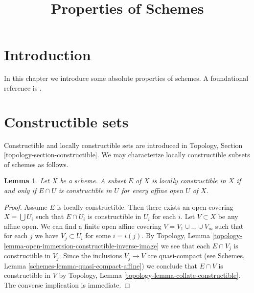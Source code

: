 \documentclass{stacks-project}
\theoremstyle{plain}
\newtheorem{lemma}[subsection]{Lemma}
\theoremstyle{definition}
\theoremstyle{remark}
\numberwithin{equation}{subsection}
\begin{document}
\title{Properties of Schemes}


\maketitle

\label{section-phantom}

\tableofcontents

\section{Introduction}
\label{section-introduction}

\noindent
In this chapter we introduce some absolute properties of schemes.
A foundational reference is \cite{EGA}.




\section{Constructible sets}
\label{section-constructible}

\noindent
Constructible and locally constructible sets are introduced in
Topology, Section \ref{topology-section-constructible}.
We may characterize locally constructible subsets of schemes as
follows.

\begin{lemma}
\label{lemma-locally-constructible}
Let $X$ be a scheme.
A subset $E$ of $X$ is locally constructible in $X$ if and only if
$E \cap U$ is constructible in $U$ for every affine open $U$ of $X$.
\end{lemma}

\begin{proof}
Assume $E$ is locally constructible. Then there exists an open covering
$X = \bigcup U_i$ such that $E \cap U_i$ is constructible in $U_i$
for each $i$. Let $V \subset X$ be any affine open. We can find a finite
open affine covering $V = V_1 \cup \ldots \cup V_m$ such that for each $j$
we have $V_j \subset U_i$ for some $i = i(j)$. By
Topology, Lemma \ref{topology-lemma-open-immersion-constructible-inverse-image}
we see that each $E \cap V_j$ is constructible in $V_j$. Since the inclusions
$V_j \to V$ are quasi-compact (see
Schemes, Lemma \ref{schemes-lemma-quasi-compact-affine})
we conclude that $E \cap V$ is constructible in $V$ by
Topology, Lemma \ref{topology-lemma-collate-constructible}.
The converse implication is immediate.
\end{proof}
\end{document}
